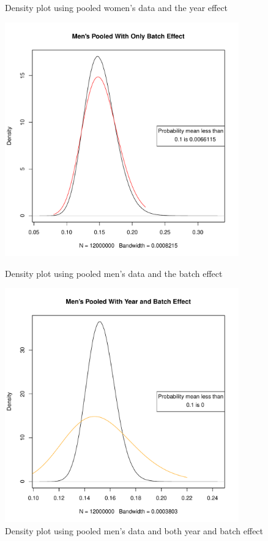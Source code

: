 \documentclass[12pt, letterpaper, titlepage]{article}
\begin{document}
\begin{figure}[h]
\begin{minipage}{0.45\textwidth}
      \caption{Density plot using pooled women's data and the year effect}
  \end{minipage}
\end{figure}

\begin{figure}[h]
  \centering
  \begin{minipage}{0.45\textwidth}
      \centering
      \includegraphics[width=0.9\textwidth]{Men_Density_Batch} %
      \caption{Density plot using pooled men's data and the batch effect}
  \end{minipage}\hfill
  \begin{minipage}{0.45\textwidth}
      \centering
      \includegraphics[width=0.9\textwidth]{Men_Density_Both} %
      \caption{Density plot using pooled men's data and both year and batch effect}
  \end{minipage}
\end{figure}
\end{document}
